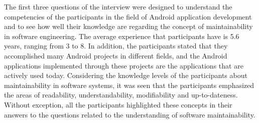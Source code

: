 The first three questions of the interview were designed to understand the competencies of the participants in the field of Android application development and to see how well their knowledge are regarding the concept of maintainability in software engineering. The average experience that participants have is 5.6 years, ranging from 3 to 8. In addition, the participants stated that they accomplished many Android projects in different fields, and the Android applications implemented through these projects are the applications that are actively used today. Considering the knowledge levels of the participants about maintainability in software systems, it was seen that the participants emphasized the areas of readability, understandability, modifiability and up-to-dateness. Without exception, all the participants highlighted these concepts in their answers to the questions related to the understanding of software maintainability.